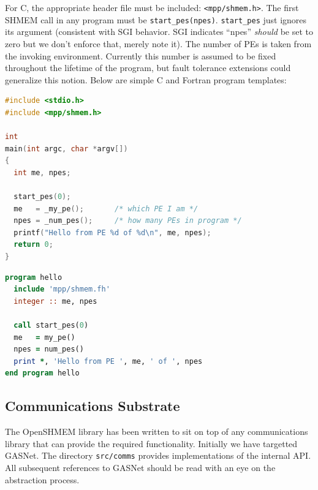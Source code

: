 \documentclass[english]{article}
\begin{document}
For C, the appropriate header file must be included:
\texttt{<mpp/shmem.h>}.  The first SHMEM call in any program must be
\texttt{start\_pes(npes)}.  \texttt{start\_pes} just ignores its argument
(consistent with SGI behavior. SGI indicates ``npes'' \emph{should} be
set to zero but we don't enforce that, merely note it). The number of
PEs is taken from the invoking environment. Currently this number is
assumed to be fixed throughout the lifetime of the program, but fault
tolerance extensions could generalize this notion. Below are simple C
and Fortran program templates:

\vspace{0.1in}
\begin{minipage}{0.75\linewidth}
\begin{lstlisting}[language=C,caption={Simple C ``hello world'' program}]
#include <stdio.h>
#include <mpp/shmem.h>

int
main(int argc, char *argv[])
{
  int me, npes;

  start_pes(0);
  me   = _my_pe();       /* which PE I am */
  npes = _num_pes();     /* how many PEs in program */
  printf("Hello from PE %d of %d\n", me, npes);
  return 0;
}
\end{lstlisting}
\end{minipage}

\vspace{0.1in}

\begin{minipage}{0.75\linewidth}
\begin{lstlisting}[language=Fortran,caption={Simple Fortran ``hello world'' program}]
program hello
  include 'mpp/shmem.fh'
  integer :: me, npes

  call start_pes(0)
  me   = my_pe()
  npes = num_pes()
  print *, 'Hello from PE ', me, ' of ', npes
end program hello
\end{lstlisting}
\end{minipage}

\subsection{Communications Substrate}

The OpenSHMEM library has been written to sit on top of any
communications library that can provide the required
functionality. Initially we have targetted GASNet. The
directory \texttt{src/comms} provides implementations of the
internal API. All subsequent references to GASNet should be read with
an eye on the abstraction process.
\end{document}
